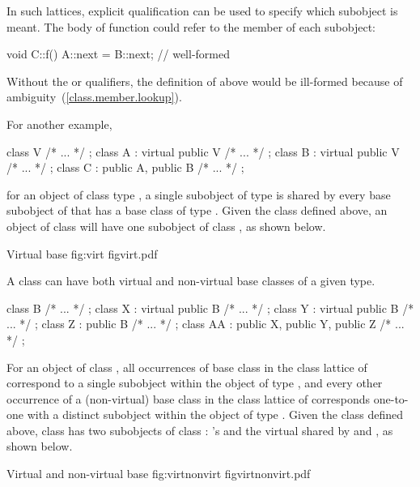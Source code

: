 \pnum
In such lattices, explicit qualification can be used to specify which
subobject is meant. The body of function  could refer to the
member  of each  subobject:
\begin{codeblock}
void C::f() { A::next = B::next; }      // well-formed
\end{codeblock}
Without the  or  qualifiers, the definition of
 above would be ill-formed because of
ambiguity~(\ref{class.member.lookup}).

\pnum
For another example,
\begin{codeblock}
class V { /* ... */ };
class A : virtual public V { /* ... */ };
class B : virtual public V { /* ... */ };
class C : public A, public B { /* ... */ };
\end{codeblock}
for an object  of class type , a single subobject of
type  is shared by every base subobject of  that has a
 base class of type . Given the class 
defined above, an object of class  will have one subobject of
class , as shown below.

%
%
\begin{importgraphic}
{Virtual base}
{fig:virt}
{figvirt.pdf}
\end{importgraphic}


\pnum
A class can have both virtual and non-virtual base classes of a given
type.
\begin{codeblock}
class B { /* ... */ };
class X : virtual public B { /* ... */ };
class Y : virtual public B { /* ... */ };
class Z : public B { /* ... */ };
class AA : public X, public Y, public Z { /* ... */ };
\end{codeblock}
For an object of class , all  occurrences of
base class  in the class lattice of  correspond to a
single  subobject within the object of type , and
every other occurrence of a (non-virtual) base class  in the
class lattice of  corresponds one-to-one with a distinct
 subobject within the object of type . Given the
class  defined above, class  has two subobjects of
class : 's  and the virtual  shared
by  and , as shown below.

%
%
%
\begin{importgraphic}
{Virtual and non-virtual base}
{fig:virtnonvirt}
{figvirtnonvirt.pdf}
\end{importgraphic}

